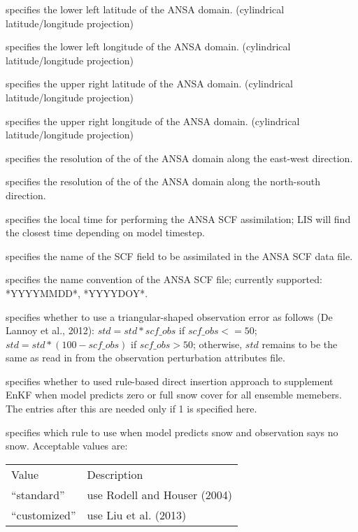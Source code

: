   specifies the lower left latitude
 of the ANSA domain. (cylindrical latitude/longitude projection)

  specifies the lower left longitude
 of the ANSA domain. (cylindrical latitude/longitude projection)

  specifies the upper right latitude
 of the ANSA domain. (cylindrical latitude/longitude projection)

  specifies the upper right longitude
 of the ANSA domain. (cylindrical latitude/longitude projection)

  specifies the resolution of the
 of the ANSA domain along the east-west direction.

  specifies the resolution of the
 of the ANSA domain along the north-south direction.

  specifies the local time
 for performing the ANSA SCF assimilation; LIS will find the closest
 time depending on model timestep.

  specifies the name of the SCF field to be
 assimilated in the ANSA SCF data file.

  specifies the name convention
 of the ANSA SCF file; currently supported: *YYYYMMDD*, *YYYYDOY*.

  specifies
 whether to use a triangular-shaped observation error as follows
 (De Lannoy et al., 2012):
 $std = std*scf\_obs$ if $scf\_obs<=50$;
 $std = std*(100-scf\_obs)$ if $scf\_obs>50$;
 otherwise, $std$ remains to be the same as read in from the observation
 perturbation attributes file.

  specifies whether to used rule-based
 direct insertion approach to supplement EnKF when model predicts zero
 or full snow cover for all ensemble memebers. The entries after this
 are needed only if 1 is specified here.

  specifies which
 rule to use when model predicts snow and observation says no snow.
 Acceptable values are:

 \begin{tabular}{ll}
 Value           & Description                  \\
  ``standard''   & use Rodell and Houser (2004) \\
  ``customized'' & use Liu et al. (2013)        \\
 \end{tabular}

